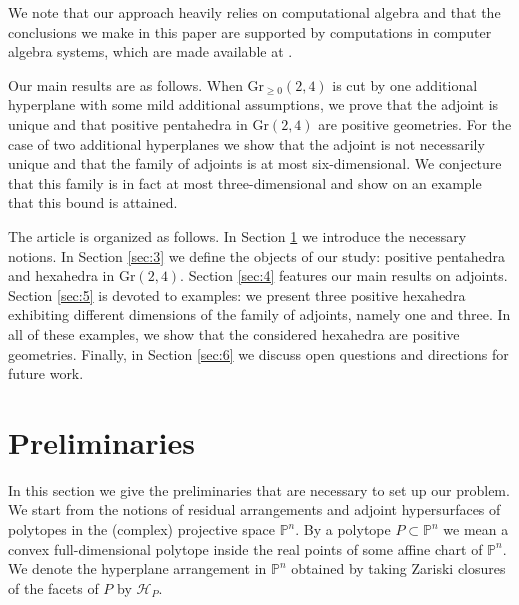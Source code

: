 \documentclass[12pt]{extarticle}
\theoremstyle{definition}
\begin{document}
We note that our approach heavily relies on computational algebra and that the conclusions we make in this paper are supported by computations in computer algebra systems, which are made available at \cite{mathrepo}.

Our main results are as follows. When $\mathrm{Gr}_{\geq 0}(2,4)$ is cut by one additional hyperplane with some mild additional assumptions, we prove that the adjoint is unique and that positive pentahedra in $\mathrm{Gr}(2,4)$ are positive geometries. For the case of two additional hyperplanes we show that the adjoint is not necessarily unique and that the family of adjoints is at most six-dimensional. We conjecture that this family is in fact at most three-dimensional and show on an example that this bound is attained. %

The article is organized as follows. In Section \ref{sec:2} we introduce the necessary notions. %
In Section \ref{sec:3} we define the objects of our study: positive pentahedra and hexahedra in $\mathrm{Gr}(2,4)$. Section \ref{sec:4} features our main results on adjoints. Section \ref{sec:5} is devoted to examples: we present three positive hexahedra exhibiting different dimensions of the family of adjoints, namely one and three. In all of these examples, we show that the considered hexahedra are positive geometries. Finally, in Section \ref{sec:6} we discuss open questions and directions for future work. 

\section{Preliminaries} \label{sec:2}
In this section we give the preliminaries that are necessary to set up our problem. We start from the notions of residual arrangements and adjoint hypersurfaces of polytopes in the (complex) projective space $\mathbb{P}^n$.  By a polytope $P\subset \mathbb{P}^n $ we mean a convex full-dimensional polytope inside the real points of some affine chart of $\mathbb{P}^n$. We denote the hyperplane arrangement in $\mathbb{P}^n$ obtained by taking Zariski closures of the facets of $P$ by $\mathcal{H}_P$. 
\end{document}
